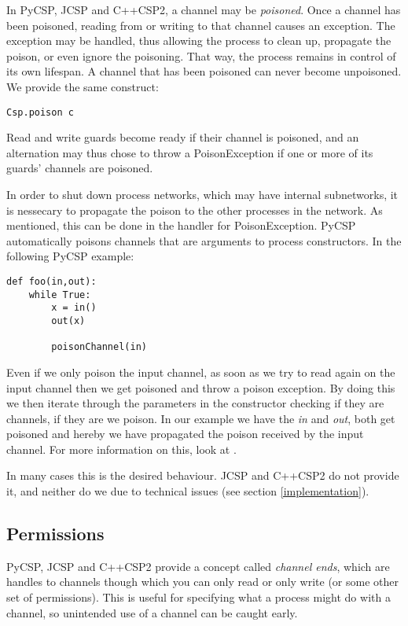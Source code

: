 \documentclass[a4paper,12pt]{article}
\begin{document}
In PyCSP, JCSP and C++CSP2, a channel may be \emph{poisoned}. Once a channel
has been poisoned, reading from or writing to that channel causes an exception.
The exception may be handled, thus allowing the process to clean up, propagate
the poison, or even ignore the poisoning. That way, the process remains in
control of its own lifespan. A channel that has been poisoned can never become
unpoisoned. We provide the same construct:

\begin{verbatim}
Csp.poison c 
\end{verbatim}

Read and write guards become ready if their channel is poisoned, and an
alternation may thus chose to throw a PoisonException if one or more of its
guards' channels are poisoned.

In order to shut down process networks, which may have internal subnetworks, it
is nessecary to propagate the poison to the other processes in the network. As
mentioned, this can be done in the handler for PoisonException. PyCSP
automatically poisons channels that are arguments to process constructors. In 
the following PyCSP example:
\begin{verbatim}
def foo(in,out):
    while True:
        x = in()
        out(x)
        
        poisonChannel(in)
\end{verbatim}
Even if we only poison the input channel, as soon as we try to read again on
the input channel then we get poisoned and throw a poison exception. By doing
this we then iterate through the parameters in the constructor checking if
they are channels, if they are we poison. In our example we have the {\it in}
and {\it out}, both get poisoned and hereby we have propagated the poison
received by the input channel. For more information on this, look at
\cite{pycsp}.

In many cases this is the desired behaviour. JCSP and C++CSP2 do not provide it,
and neither do we due to technical issues (see section \ref{implementation}).

\subsection{Permissions}

PyCSP, JCSP and C++CSP2 provide a concept called \emph{channel ends}, which are
handles to channels though which you can only read or only write (or some other
set of permissions). This is useful for specifying what a process might do with
a channel, so unintended use of a channel can be caught early.
\end{document}
